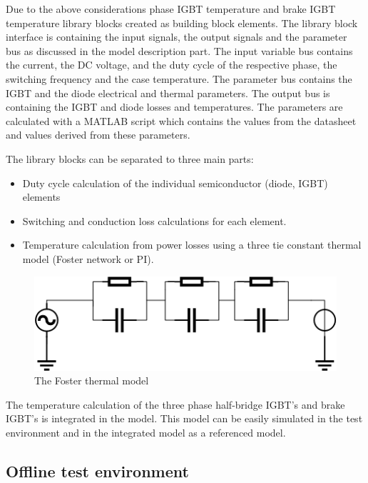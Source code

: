 Due to the above considerations phase IGBT temperature and brake IGBT temperature library blocks created as building block elements. The library block interface is containing the input signals, the output signals and the parameter bus as discussed in the model description part.
The input variable bus contains the current, the DC voltage, and the duty cycle of the respective phase, the switching frequency and the case temperature. The parameter bus contains the IGBT and the diode electrical and thermal parameters. The output bus is containing the IGBT and diode losses and temperatures. The parameters are calculated with a MATLAB script which contains the values from the datasheet and values derived from these parameters.

The library blocks can be separated to three main parts:
\begin{itemize}
    \item Duty cycle calculation of the individual semiconductor (diode, IGBT) elements
    \item Switching and conduction loss calculations for each element.
    \item Temperature calculation from power losses using a three tie constant thermal model (Foster network or PI). 
\end{itemize}

\begin{figure}[!h]
\centering
\includegraphics[width=0.9\columnwidth]{figures/foster.png}
\caption{The Foster thermal model}
\label{fig:foster}
\end{figure}

The temperature calculation of the three phase half-bridge IGBT's and brake IGBT's is integrated in the model. This model can be easily simulated in the test environment and in the integrated model as a referenced model.

\subsection{Offline test environment}

